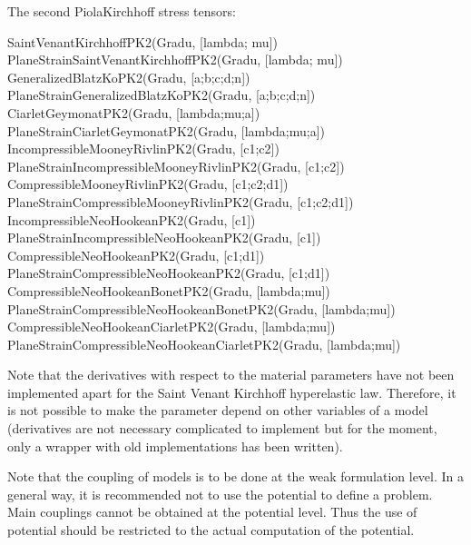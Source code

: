 \documentclass[a4paper,11pt,english]{sphinxmanual}
\begin{document}
The second Piola\sphinxhyphen{}Kirchhoff stress tensors:

\begin{sphinxVerbatim}[commandchars=\\\{\}]
Saint\PYGZus{}Venant\PYGZus{}Kirchhoff\PYGZus{}PK2(Grad\PYGZus{}u, [lambda; mu])
Plane\PYGZus{}Strain\PYGZus{}Saint\PYGZus{}Venant\PYGZus{}Kirchhoff\PYGZus{}PK2(Grad\PYGZus{}u, [lambda; mu])
Generalized\PYGZus{}Blatz\PYGZus{}Ko\PYGZus{}PK2(Grad\PYGZus{}u, [a;b;c;d;n])
Plane\PYGZus{}Strain\PYGZus{}Generalized\PYGZus{}Blatz\PYGZus{}Ko\PYGZus{}PK2(Grad\PYGZus{}u, [a;b;c;d;n])
Ciarlet\PYGZus{}Geymonat\PYGZus{}PK2(Grad\PYGZus{}u, [lambda;mu;a])
Plane\PYGZus{}Strain\PYGZus{}Ciarlet\PYGZus{}Geymonat\PYGZus{}PK2(Grad\PYGZus{}u, [lambda;mu;a])
Incompressible\PYGZus{}Mooney\PYGZus{}Rivlin\PYGZus{}PK2(Grad\PYGZus{}u, [c1;c2])
Plane\PYGZus{}Strain\PYGZus{}Incompressible\PYGZus{}Mooney\PYGZus{}Rivlin\PYGZus{}PK2(Grad\PYGZus{}u, [c1;c2])
Compressible\PYGZus{}Mooney\PYGZus{}Rivlin\PYGZus{}PK2(Grad\PYGZus{}u, [c1;c2;d1])
Plane\PYGZus{}Strain\PYGZus{}Compressible\PYGZus{}Mooney\PYGZus{}Rivlin\PYGZus{}PK2(Grad\PYGZus{}u, [c1;c2;d1])
Incompressible\PYGZus{}Neo\PYGZus{}Hookean\PYGZus{}PK2(Grad\PYGZus{}u, [c1])
Plane\PYGZus{}Strain\PYGZus{}Incompressible\PYGZus{}Neo\PYGZus{}Hookean\PYGZus{}PK2(Grad\PYGZus{}u, [c1])
Compressible\PYGZus{}Neo\PYGZus{}Hookean\PYGZus{}PK2(Grad\PYGZus{}u, [c1;d1])
Plane\PYGZus{}Strain\PYGZus{}Compressible\PYGZus{}Neo\PYGZus{}Hookean\PYGZus{}PK2(Grad\PYGZus{}u, [c1;d1])
Compressible\PYGZus{}Neo\PYGZus{}Hookean\PYGZus{}Bonet\PYGZus{}PK2(Grad\PYGZus{}u, [lambda;mu])
Plane\PYGZus{}Strain\PYGZus{}Compressible\PYGZus{}Neo\PYGZus{}Hookean\PYGZus{}Bonet\PYGZus{}PK2(Grad\PYGZus{}u, [lambda;mu])
Compressible\PYGZus{}Neo\PYGZus{}Hookean\PYGZus{}Ciarlet\PYGZus{}PK2(Grad\PYGZus{}u, [lambda;mu])
Plane\PYGZus{}Strain\PYGZus{}Compressible\PYGZus{}Neo\PYGZus{}Hookean\PYGZus{}Ciarlet\PYGZus{}PK2(Grad\PYGZus{}u, [lambda;mu])
\end{sphinxVerbatim}

Note that the derivatives with respect to the material parameters have not been implemented apart for the Saint Venant Kirchhoff hyperelastic law. Therefore, it is not possible to make the parameter depend on other variables of a model (derivatives are not necessary complicated to implement but for the moment, only a wrapper with old implementations has been written).

Note that the coupling of models is to be done at the weak formulation level. In a general way, it is recommended not to use the potential to define a problem. Main couplings cannot be obtained at the potential level. Thus the use of potential should be restricted to the actual computation of the potential.
\end{document}
